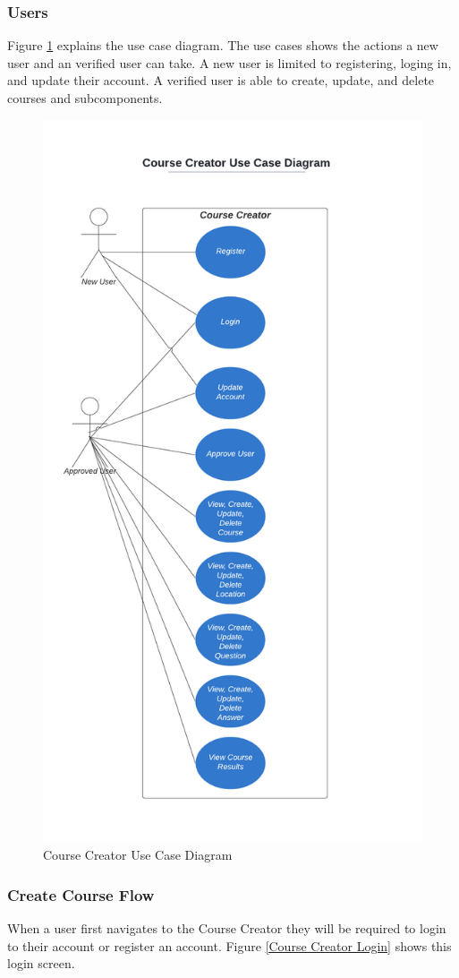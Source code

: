 \subsubsection{Users}
Figure \ref{Course Creator Use Case Diagram} explains the use case diagram. The use cases shows the actions a new user and an verified user can take. A new user is limited to registering, loging in, and update their account. A verified user is able to create, update, and delete courses and subcomponents.

\begin{figure}[htb]
	\centering
	\includegraphics[width=.6\textwidth]{Requirements/assets/course-creator-use-case-diagram.png}
	\caption[Course Creator Use Case Diagram]{\label{Course Creator Use Case Diagram}Course Creator Use Case Diagram}
\end{figure}

\subsubsection{Create Course Flow}
When a user first navigates to the Course Creator they will be required to login to their account or register an account. Figure \ref{Course Creator Login} shows this login screen.

